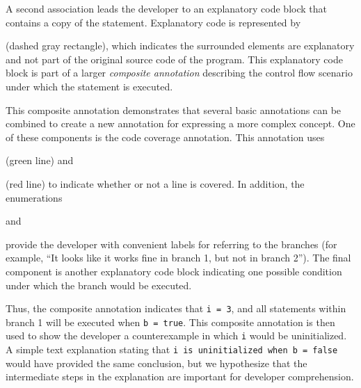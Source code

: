 \documentclass[conference]{IEEEtran}
\begin{document}
A second association leads the developer to an explanatory code block that contains a copy of the statement. Explanatory code is represented by
 (dashed gray rectangle), which indicates the surrounded elements are explanatory and not part of the original source code of the program. This explanatory code block is part of a larger \textit{composite annotation} describing the control flow scenario under which the statement is executed.

This composite annotation demonstrates that several basic annotations can be combined to create a new annotation for expressing a more complex concept. One of these components is the code coverage annotation. This annotation uses
 (green line) and 
 (red line) to indicate whether or not a line is covered. In addition, the enumerations  and  provide the developer with convenient labels for referring to the branches (for example, ``It looks like it works fine in branch 1, but not in branch 2''). The final component is another explanatory code block indicating one possible condition under which the branch would be executed.

Thus, the composite annotation indicates that \texttt{i = 3}, and all statements within branch 1 will be executed when \texttt{b = true}. This composite annotation is then used to show the developer a counterexample in which \texttt{i} would be uninitialized. A simple text explanation stating that \texttt{i is uninitialized when b = false} would have provided the same conclusion, but we hypothesize that the intermediate steps in the explanation are important for developer comprehension.
\end{document}
